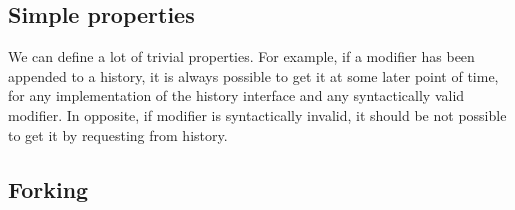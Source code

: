 \subsection{Simple properties}

We can define a lot of trivial properties. For example, if a modifier has been appended to a history, it is always possible to get it at some later point of time, for any implementation of the history interface and any syntactically valid modifier. In opposite, if modifier is syntactically invalid, it should be not possible to get it by requesting from history. 

\subsection{Forking}


